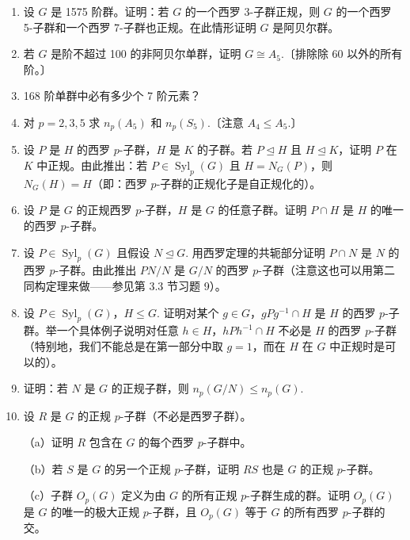 \begin{enumerate}
\item 设 \(G\) 是 1575 阶群。证明：若 \(G\) 的一个西罗 3-子群正规，则 \(G\) 的一个西罗 5-子群和一个西罗 7-子群也正规。在此情形证明 \(G\) 是阿贝尔群。

\item 若 \(G\) 是阶不超过 100 的非阿贝尔单群，证明 \(G \cong A_5\).〔排除除 60 以外的所有阶。〕

\item 168 阶单群中必有多少个 7 阶元素？

\item 对 \(p = 2, 3, 5\) 求 \(n_p(A_5)\) 和 \(n_p(S_5)\).〔注意 \(A_4 \leq A_5\).〕

\item 设 \(P\) 是 \(H\) 的西罗 \(p\)-子群，\(H\) 是 \(K\) 的子群。若 \(P \trianglelefteq H\) 且 \(H \trianglelefteq K\)，证明 \(P\) 在 \(K\) 中正规。由此推出：若 \(P \in \operatorname{Syl}_p(G)\) 且 \(H = N_G(P)\)，则 \(N_G(H) = H\)（即：西罗 \(p\)-子群的正规化子是自正规化的）。

\item 设 \(P\) 是 \(G\) 的正规西罗 \(p\)-子群，\(H\) 是 \(G\) 的任意子群。证明 \(P \cap H\) 是 \(H\) 的唯一的西罗 \(p\)-子群。

\item 设 \(P \in \operatorname{Syl}_p(G)\) 且假设 \(N \trianglelefteq G\). 用西罗定理的共轭部分证明 \(P \cap N\) 是 \(N\) 的西罗 \(p\)-子群。由此推出 \(PN/N\) 是 \(G/N\) 的西罗 \(p\)-子群（注意这也可以用第二同构定理来做——参见第 3.3 节习题 9）。

\item 设 \(P \in \operatorname{Syl}_p(G)\)，\(H \leq G\). 证明对某个 \(g \in G\)，\(gPg^{-1} \cap H\) 是 \(H\) 的西罗 \(p\)-子群。举一个具体例子说明对任意 \(h \in H\)，\(hPh^{-1} \cap H\) 不必是 \(H\) 的西罗 \(p\)-子群（特别地，我们不能总是在第一部分中取 \(g = 1\)，而在 \(H\) 在 \(G\) 中正规时是可以的）。

\item 证明：若 \(N\) 是 \(G\) 的正规子群，则 \(n_p(G/N) \leq n_p(G)\).

\item 设 \(R\) 是 \(G\) 的正规 \(p\)-子群（不必是西罗子群）。

（a）证明 \(R\) 包含在 \(G\) 的每个西罗 \(p\)-子群中。

（b）若 \(S\) 是 \(G\) 的另一个正规 \(p\)-子群，证明 \(RS\) 也是 \(G\) 的正规 \(p\)-子群。

（c）子群 \(O_p(G)\) 定义为由 \(G\) 的所有正规 \(p\)-子群生成的群。证明 \(O_p(G)\) 是 \(G\) 的唯一的极大正规 \(p\)-子群，且 \(O_p(G)\) 等于 \(G\) 的所有西罗 \(p\)-子群的交。


\end{enumerate}
